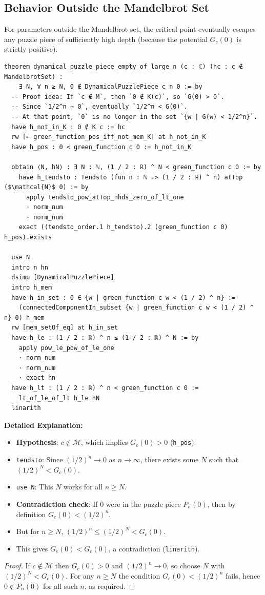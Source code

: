 \subsection{Behavior Outside the Mandelbrot Set}

For parameters outside the Mandelbrot set, the critical point eventually escapes any puzzle piece of sufficiently high depth (because the potential $G_c(0)$ is strictly positive).

\begin{lstlisting}[language=Lean]
theorem dynamical_puzzle_piece_empty_of_large_n (c : ℂ) (hc : c ∉ MandelbrotSet) :
    ∃ N, ∀ n ≥ N, 0 ∉ DynamicalPuzzlePiece c n 0 := by
  -- Proof idea: If `c ∉ M`, then `0 ∉ K(c)`, so `G(0) > 0`.
  -- Since `1/2^n → 0`, eventually `1/2^n < G(0)`.
  -- At that point, `0` is no longer in the set `{w | G(w) < 1/2^n}`.
  have h_not_in_K : 0 ∉ K c := hc
  rw [← green_function_pos_iff_not_mem_K] at h_not_in_K
  have h_pos : 0 < green_function c 0 := h_not_in_K

  obtain ⟨N, hN⟩ : ∃ N : ℕ, (1 / 2 : ℝ) ^ N < green_function c 0 := by
    have h_tendsto : Tendsto (fun n : ℕ => (1 / 2 : ℝ) ^ n) atTop ($\mathcal{N}$ 0) := by
      apply tendsto_pow_atTop_nhds_zero_of_lt_one
      · norm_num
      · norm_num
    exact ((tendsto_order.1 h_tendsto).2 (green_function c 0) h_pos).exists

  use N
  intro n hn
  dsimp [DynamicalPuzzlePiece]
  intro h_mem
  have h_in_set : 0 ∈ {w | green_function c w < (1 / 2) ^ n} :=
    (connectedComponentIn_subset {w | green_function c w < (1 / 2) ^ n} 0) h_mem
  rw [mem_setOf_eq] at h_in_set
  have h_le : (1 / 2 : ℝ) ^ n ≤ (1 / 2 : ℝ) ^ N := by
    apply pow_le_pow_of_le_one
    · norm_num
    · norm_num
    · exact hn
  have h_lt : (1 / 2 : ℝ) ^ n < green_function c 0 :=
    lt_of_le_of_lt h_le hN
  linarith
\end{lstlisting}

\noindent
\textbf{Detailed Explanation:}
\begin{itemize}
    \item \textbf{Hypothesis}: $c \notin \mathcal{M}$, which implies $G_c(0) > 0$ (\texttt{h\_pos}).
    \item \texttt{tendsto}: Since $(1/2)^n \to 0$ as $n \to \infty$, there exists some $N$ such that $(1/2)^N < G_c(0)$.
    \item \texttt{use N}: This $N$ works for all $n \ge N$.
    \item \textbf{Contradiction check}: If $0$ were in the puzzle piece $P_n(0)$, then by definition $G_c(0) < (1/2)^n$.
    \item But for $n \ge N$, $(1/2)^n \le (1/2)^N < G_c(0)$.
    \item This gives $G_c(0) < G_c(0)$, a contradiction (\texttt{linarith}).
\end{itemize}

\begin{proof}
If $c\notin\mathcal{M}$ then $G_c(0)>0$ and $(1/2)^n\to0$, so choose $N$ with $(1/2)^N<G_c(0)$. For any $n\ge N$ the condition $G_c(0)<(1/2)^n$ fails, hence $0\notin P_n(0)$ for all such $n$, as required.
\end{proof}
